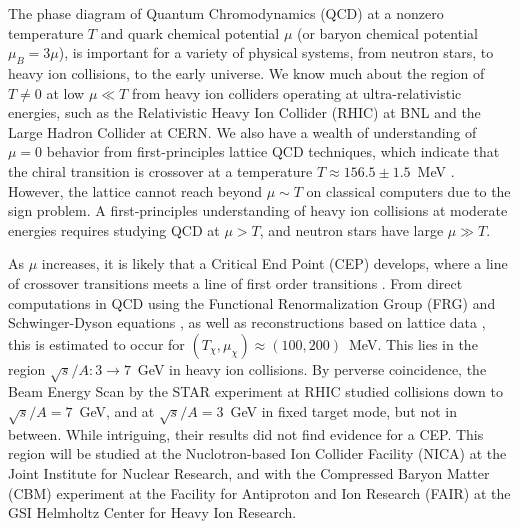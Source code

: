 \documentclass[twocolumn,prd,superscriptaddress, colorlinks, linkcolor=refcol, citecolor=refcol, urlcolor=refcol]{revtex4-2}
\begin{document}
\maketitle

The phase diagram of Quantum Chromodynamics (QCD) at a nonzero temperature $T$ and quark chemical potential $\mu$ (or baryon chemical potential $\mu_B = 3 \mu$), is important for a variety of physical systems, from neutron stars, to heavy ion collisions, to the early universe. 
We know much about the region of $T \neq 0$ at low $\mu \ll T$ from heavy ion colliders operating at ultra-relativistic energies, such as the Relativistic Heavy Ion Collider (RHIC) at BNL and the Large Hadron Collider at CERN.
We also have a wealth of understanding of $\mu=0$ behavior from first-principles lattice QCD techniques, which indicate that the chiral transition is crossover at a temperature $T \approx 156.5 \pm 1.5$~MeV
\cite{HotQCD:2018pds,Borsanyi:2020fev}.
However, the lattice cannot reach beyond $\mu \sim T$ on classical computers due to  
the sign problem. 
A first-principles understanding of heavy ion collisions at moderate energies requires studying QCD at $\mu > T$, and neutron stars 
have large $\mu \gg T$.  

As $\mu$ increases, it is likely that a Critical End Point (CEP) develops, where a line of crossover
transitions meets a line of first order transitions
\cite{Asakawa:1989bq,Stephanov:1998dy,Stephanov:1999zu,Parotto:2018pwx,Bzdak:2019pkr}. From direct computations in QCD using the
Functional Renormalization Group (FRG) \cite{Fu:2019hdw} and
Schwinger-Dyson equations \cite{Gao:2020qsj, Gao:2020fbl, Gunkel:2021oya}, as well as reconstructions based on lattice data
\cite{Basar:2023nkp, Clarke:2024ugt}, this is estimated to occur
for $(T_\chi,\mu_\chi) \approx (100,200)$~MeV.  This lies in the region $\sqrt{s}/A: 3 \rightarrow 7$~GeV
in heavy ion collisions.  By perverse coincidence, the Beam Energy Scan by the STAR experiment at RHIC studied collisions down to $\sqrt{s}/A = 7$~GeV, and at $\sqrt{s}/A = 3$~GeV in fixed target mode, but not in between.  
While intriguing, their results did not find evidence for a CEP.  This region will be studied at the Nuclotron-based Ion Collider Facility
(NICA) at the Joint Institute for Nuclear Research, and 
with the Compressed Baryon Matter (CBM) experiment at 
the Facility for Antiproton and Ion Research (FAIR) at the GSI Helmholtz Center for Heavy Ion Research.
\end{document}
